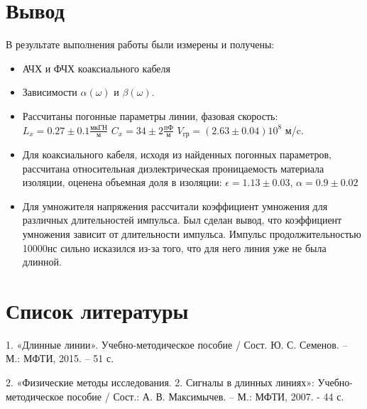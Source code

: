 \documentclass[12pt]{article}
\begin{document}
\begin{flushleft}
\section{Вывод}
В результате выполнения работы были измерены и получены:
\begin{itemize}
\item АЧХ и ФЧХ коаксиального кабеля
\item Зависимости $\alpha (\omega)$ и $\beta (\omega)$.
\item Рассчитаны погонные параметры линии, фазовая скорость: $L_x = 0.27 \pm 0.1 \frac{\text{мкГН}}{\text{м}}$ \hspace{0.5cm} $C_x = 34 \pm 2 \frac{\text{пФ}}{\text{м}}$ \hspace{0.5cm} $V_{\text{гр}}= (2.63 \pm 0.04) 10^8$ м/c.
\item Для коаксиального кабеля, исходя из найденных погонных параметров, рассчитана относительная диэлектрическая проницаемость материала изоляции, оценена объемная доля в изоляции: $\epsilon = 1.13 \pm 0.03$, $\alpha = 0.9 \pm 0.02$
\item Для умножителя напряжения рассчитали коэффициент умножения для различных длительностей импульса. Был сделан вывод, что коэффициент умножения зависит от длительности импульса. Импульс продолжительностью 10000нс сильно исказился из-за того, что для него линия уже не была длинной.
\end{itemize}
\section{Список литературы}
1. «Длинные линии». Учебно-методическое пособие / Сост. Ю. С. Семенов. – М.: МФТИ, 2015. – 51 с.

2. «Физические методы исследования. 2. Сигналы в длинных линиях»: Учебно-методическое пособие / Сост.: А. В. Максимычев. – М.: МФТИ, 2007. - 44 с.
\end{flushleft}
\end{document}
